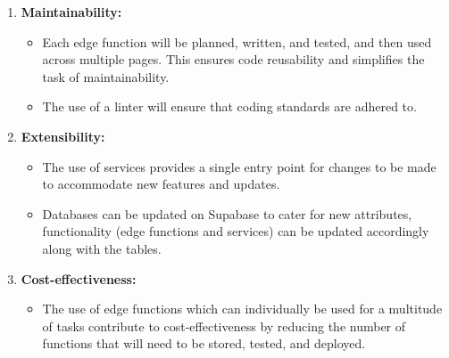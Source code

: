 \documentclass{article}
\begin{document}
\begin{enumerate}[label=\arabic*.]
    \item \textbf{Maintainability:}
    \begin{itemize}
        \item Each edge function will be planned, written, and tested, and then used across multiple pages. This ensures code reusability and simplifies the task of maintainability.
        \item The use of a linter will ensure that coding standards are adhered to.
    \end{itemize}

    \item \textbf{Extensibility:}
    \begin{itemize}
        \item The use of services provides a single entry point for changes to be made to accommodate new features and updates.
        \item Databases can be updated on Supabase to cater for new attributes, functionality (edge functions and services) can be updated accordingly along with the tables.
    \end{itemize}

    \item \textbf{Cost-effectiveness:}
    \begin{itemize}
        \item The use of edge functions which can individually be used for a multitude of tasks contribute to cost-effectiveness by reducing the number of functions that will need to be stored, tested, and deployed.
    \end{itemize}
\end{enumerate}
\end{document}
